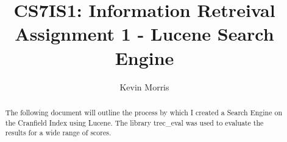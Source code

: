 \documentclass[acmtog, authorversion]{acmart}
\begin{document}
\title{CS7IS1: Information Retreival Assignment 1 - Lucene Search Engine}

\author{Kevin Morris}

\begin{abstract}
The following document will outline the process by which I created a Search Engine on the Cranfield Index using Lucene. The library trec\_eval was used to evaluate the results for a wide range of scores. 
\end{abstract}

\maketitle


\end{document}
